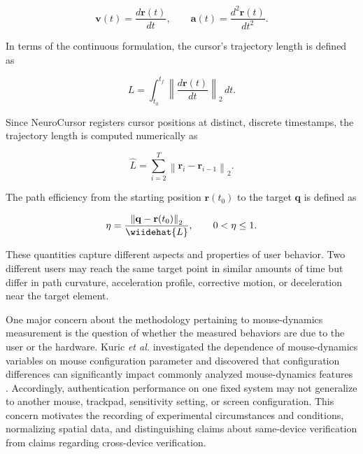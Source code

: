 \documentclass[conference]{IEEEtran}
\begin{document}
\begin{equation}
\mathbf{v}(t)
=
\frac{d\mathbf{r}(t)}{dt},
\qquad
\mathbf{a}(t)
=
\frac{d^2\mathbf{r}(t)}{dt^2}.
\label{eq:velocity_acceleration}
\end{equation}

In terms of the continuous formulation, the cursor's trajectory length is defined as

\begin{equation}
L
=
\int_{t_0}^{t_f}
\left\|
\frac{d\mathbf{r}(t)}{dt}
\right\|_2
\,dt.
\label{eq:continuous_path_length}
\end{equation}

Since NeuroCursor registers cursor positions at distinct, discrete timestamps, the trajectory length is computed numerically as 

\begin{equation}
\widehat{L}=
\sum_{i=2}^{T}
\left\|
\mathbf{r}_i-\mathbf{r}_{i-1}
\right\|_2.
\label{eq:discrete_path_length}
\end{equation}

The path efficiency from the starting position $\mathbf{r}(t_0)$ to the target $\mathbf{q}$ is defined as 

\begin{equation}
\eta
=
\frac{
\left\|
\mathbf{q}-\mathbf{r}(t_0)
\right\|_2
}{
\wiidehat{L}
},
\qquad
0 < \eta \leq 1.
\label{eq:path_efficiency}
\end{equation}

These quantities capture different aspects and properties of user behavior. Two different users may reach the same target point in similar amounts of time but differ in path curvature, acceleration profile, corrective motion, or deceleration near the target element. 

One major concern about the methodology pertaining to mouse-dynamics measurement is the question of whether the measured behaviors are due to the user or the hardware. Kuric \textit{et al.} investigated the dependence of mouse-dynamics variables on mouse configuration parameter and discovered that configuration differences can significantly impact commonly analyzed mouse-dynamics features \cite{kuricMouseCredibility}. Accordingly, authentication performance on one fixed system may not generalize to another mouse, trackpad, sensitivity setting, or screen configuration. This concern motivates the recording of experimental circumstances and conditions, normalizing spatial data, and distinguishing claims about same-device verification from claims regarding cross-device verification. 
\end{document}
